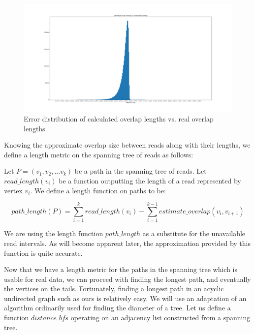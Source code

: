 \begin{figure}
\includegraphics[width=400bp]{figures/overlap_error.png}
\caption{Error distribution of calculated overlap lengths vs. real overlap lengths}
\label{fig:overlap_error}
\end{figure}

Knowing the approximate overlap size between reads along with their lengths, we define a length metric on the spanning tree of reads as follows:

Let $P = (v_1, v_2, ... v_k)$ be a path in the spanning tree of reads. Let $read\_length(v_i)$ be a function outputting the length of a read represented by vertex $v_i$. We define a length function on paths to be:

$$path\_length(P) = \sum_{i = 1}^{k}{read\_length(v_i)} - \sum_{i = 1}^{k - 1}{estimate\_overlap(v_i, v_{i + 1})}$$

We are using the length function $path\_length$ as a substitute for the unavailable read intervals. As will become apparent later, the approximation provided by this function is quite accurate.

Now that we have a length metric for the paths in the spanning tree which is usable for real data, we can proceed with finding the longest path, and eventually the vertices on the tails.
Fortunately, finding a longest path in an acyclic undirected graph such as ours is relatively easy. We will use an adaptation of an algorithm ordinarily used for finding the diameter of a tree\cite{diameter}. Let us define a function $distance\_bfs$ operating on an adjacency list constructed from a spanning tree.

